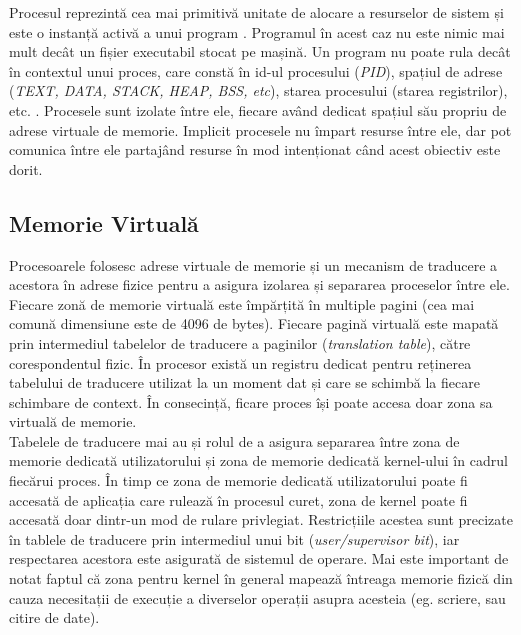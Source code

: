 Procesul reprezintă cea mai primitivă unitate de alocare a resurselor de sistem
și este o instanță activă a unui program \cite{processes}. Programul în acest
caz nu este nimic mai mult decât un fișier executabil stocat pe mașină. Un
program nu poate rula decât în contextul unui proces, care constă în id-ul
procesului (\emph{PID}), spațiul de adrese (\emph{TEXT, DATA, STACK, HEAP, BSS,
etc}), starea procesului (starea registrilor), etc. \cite{exception_processes}.
Procesele sunt izolate între ele, fiecare având dedicat spațiul său propriu de
adrese virtuale de memorie. Implicit procesele nu împart resurse între ele, dar
pot comunica între ele partajând resurse în mod intenționat când acest obiectiv
este dorit.

\subsection{Memorie Virtuală}
\label{sec:virtual_memory}

Procesoarele folosesc adrese virtuale de memorie și un mecanism de traducere a
acestora în adrese fizice pentru a asigura izolarea și separarea proceselor
între ele. Fiecare zonă de memorie virtuală este împărțită în multiple pagini
(cea mai comună dimensiune este de 4096 de bytes). Fiecare pagină virtuală este
mapată prin intermediul tabelelor de traducere a paginilor (\emph{translation
table}), către corespondentul fizic. În procesor există un registru dedicat pentru 
reținerea tabelului de traducere utilizat la un moment dat și care se schimbă la 
fiecare schimbare de context. În consecință, ficare proces își poate accesa doar 
zona sa virtuală de memorie. \\

Tabelele de traducere mai au și rolul de a asigura separarea între zona de
memorie dedicată utilizatorului și zona de memorie dedicată kernel-ului în
cadrul fiecărui proces. În timp ce zona de memorie dedicată utilizatorului poate
fi accesată de aplicația care rulează în procesul curet, zona de kernel poate
fi accesată doar dintr-un mod de rulare privlegiat. Restricțiile
acestea sunt precizate în tablele de traducere prin intermediul unui bit
(\emph{user/supervisor bit}), iar respectarea acestora este asigurată de
sistemul de operare. Mai este important de notat faptul că zona pentru kernel
în general mapează întreaga memorie fizică din cauza necesitații de execuție a
diverselor operații asupra acesteia (eg. scriere, sau citire de date).\\

